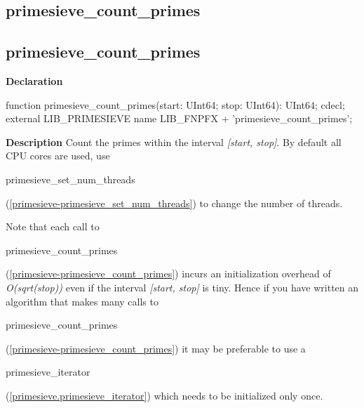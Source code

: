 \documentclass{report}
\newif\ifpdf
\begin{document}
\subsection*{\large{\textbf{primesieve{\_}count{\_}primes}}\normalsize\hspace{1ex}\hrulefill}
\else
\subsection*{primesieve{\_}count{\_}primes}
\fi
\label{primesieve-primesieve_count_primes}
\begin{list}{}{
\setlength{\itemindent}{0cm}
\setlength{\listparindent}{0cm}
\setlength{\leftmargin}{\evensidemargin}
\addtolength{\leftmargin}{\tmplength}
\settowidth{\labelsep}{X}
\addtolength{\leftmargin}{\labelsep}
\setlength{\labelwidth}{\tmplength}
}
\item[\textbf{Declaration}\hfill]
\ifpdf
\begin{flushleft}
\fi
\begin{ttfamily}
function primesieve{\_}count{\_}primes(start: UInt64; stop: UInt64): UInt64; cdecl; external LIB{\_}PRIMESIEVE name LIB{\_}FNPFX + 'primesieve{\_}count{\_}primes';\end{ttfamily}

\ifpdf
\end{flushleft}
\fi

\par
\item[\textbf{Description}]
Count the primes within the interval \textit{[start, stop]}. By default all CPU cores are used, use \begin{ttfamily}primesieve{\_}set{\_}num{\_}threads\end{ttfamily}(\ref{primesieve-primesieve_set_num_threads}) to change the number of threads.

Note that each call to \begin{ttfamily}primesieve{\_}count{\_}primes\end{ttfamily}(\ref{primesieve-primesieve_count_primes}) incurs an initialization overhead of \textit{O(sqrt(stop))} even if the interval \textit{[start, stop]} is tiny. Hence if you have written an algorithm that makes many calls to \begin{ttfamily}primesieve{\_}count{\_}primes\end{ttfamily}(\ref{primesieve-primesieve_count_primes}) it may be preferable to use a \begin{ttfamily}primesieve{\_}iterator\end{ttfamily}(\ref{primesieve.primesieve_iterator}) which needs to be initialized only once.

\end{list}
\ifpdf
\end{document}

